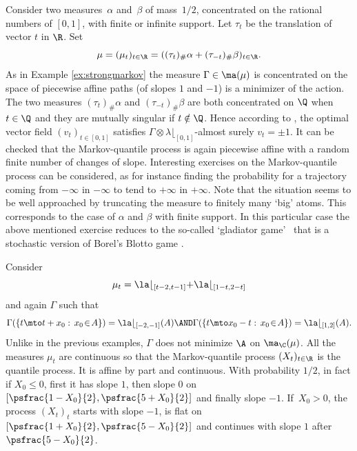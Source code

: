 \begin{ex}\label{ex:rationnal}
Consider two measures~$\alpha$ and~$\beta$ of mass~$1/2$, concentrated on the rational numbers of $[0,1]$, with finite or infinite support. Let $\tau_t$ be the translation of vector $t$ in $\R$. Set
\[
\mu=(\mu_t)_{t\in\R}=((\tau_t)_\#\alpha+(\tau_{-t})_\#\beta)_{t\in\R}.
\]
As in Example \ref{ex:strongmarkov} the measure $\Gamma\in \ma(\mu)$ is concentrated on the space of piecewise affine paths (of slopes $1$ and $-1$) is a minimizer of the action. The two measures $(\tau_t)_\#\alpha$ and $(\tau_{-t})_\#\beta$ are both concentrated on $\Q$ when $t\in \Q$ and they are mutually singular if $t\notin \Q$. Hence according to \cite{BouJui2}, the optimal vector field $(v_t)_{t\in [0,1]}$ satisfies $\Gamma\otimes \lambda\lfloor_{[0,1]}$-almost surely $v_t=\pm 1$. It can be checked that the Markov-quantile process is again piecewise affine with a random finite number of changes of slope. Interesting exercises on the Markov-quantile process can be considered, as for instance finding the probability for a trajectory coming from $-\infty$ in $-\infty$ to tend to $+\infty$ in $+\infty$. Note that the situation seems to be well approached by truncating the measure to finitely many `big' atoms. This corresponds to the case of $\alpha$ and $\beta$ with finite support. In this particular case the above mentioned exercise reduces to the so-called `gladiator game'~\cite{KLN} that is a stochastic version of Borel's Blotto game \cite{RSY}.
\end{ex}

\begin{ex}\label{ex:continuous}Consider
\[
\mu_t=\la\lfloor_{[t-2,t-1]}+\la\lfloor_{[1-t,2-t]}
\]
and again $\Gamma$ such that
\[\textstyle
\Gamma(\{t\mto t+x_0:\,x_0\!\in\!A\})=\la\lfloor_{[-2,-1]}(A)\AND \Gamma(\{t\mto x_0-t:\,x_0\!\in\! A\})=\la\lfloor_{[1,2]}(A).
\]
Unlike in the previous examples, $\Gamma$ does not minimize $\A$ on $\ma_\C(\mu)$. All the measures $\mu_t$ are continuous so that the Markov-quantile process $(X_t)_{t\in \R}$ is the quantile process. It is affine by part and continuous. With probability $1/2$, in fact if $X_0\leq 0$, first it has slope $1$, then slope $0$ on $[\psfrac{1-X_0}{2},\psfrac{5+X_0}{2}]$ and finally slope $-1$. If~$X_0>0$, the process $(X_t)_{t}$ starts with slope $-1$, is flat on $[\psfrac{1+X_0}{2},\psfrac{5-X_0}{2}]$ and continues with slope $1$ after $\psfrac{5-X_0}{2}$.
\end{ex}

